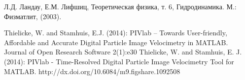 \begin{thebibliography}{99}


Л.Д. Ландау, Е.М. Лифшиц, Теоретическая физика, т. 6, Гидродинамика. М.: Физматлит, (2003).

Thielicke, W. and Stamhuis, E.J. (2014): PIVlab – Towards User-friendly, Affordable and Accurate Digital Particle Image Velocimetry in MATLAB. Journal of Open Research Software 2(1):e30
Thielicke, W. and Stamhuis, E. J. (2014): PIVlab - Time-Resolved Digital Particle Image Velocimetry Tool for MATLAB. http://dx.doi.org/10.6084/m9.figshare.1092508 





\end{thebibliography}
